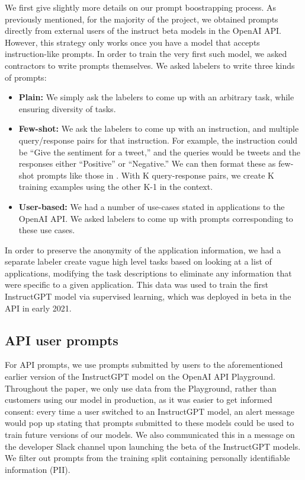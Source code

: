 \documentclass{article}
\begin{document}
We first give slightly more details on our prompt boostrapping process. 
As previously mentioned, for the majority of the project, we obtained prompts directly from external users of the instruct beta models in the OpenAI API.  However, this strategy only works once you have a model that accepts instruction-like prompts.  In order to train the very first such model, we asked contractors to write prompts themselves.  We asked labelers to write three kinds of prompts:
\begin{itemize}
    \item \textbf{Plain:}  We simply ask the labelers to come up with an arbitrary task, while ensuring diversity of tasks.
\item \textbf{Few-shot:}  We ask the labelers to come up with an instruction, and multiple query/response pairs for that instruction.  For example, the instruction could be ``Give the sentiment for a tweet,'' and the queries would be tweets and the responses either ``Positive'' or ``Negative.''  We can then format these as few-shot prompts like those in \citet{brown2020language}.  With K query-response pairs, we create K training examples using the other K-1 in the context.
\item \textbf{User-based:}  We had a number of use-cases stated in applications to the OpenAI API.  We asked labelers to come up with prompts corresponding to these use cases.
\end{itemize}
 In order to preserve the anonymity of the application information, we had a separate labeler create vague high level tasks based on looking at a list of applications, modifying the task descriptions to eliminate any information that were specific to a given application. This data was used to train the first InstructGPT model via supervised learning, which was deployed in beta in the API in early 2021. 

\subsection{API user prompts}

For API prompts, we use prompts submitted by users to the aforementioned earlier version of the InstructGPT model on the OpenAI API Playground. Throughout the paper, we only use data from the Playground, rather than customers using our model in production, as it was easier to get informed consent: every time a user switched to an InstructGPT model, an alert message would pop up stating that prompts submitted to these models could be used to train future versions of our models. We also communicated this in a message on the developer Slack channel upon launching the beta of the InstructGPT models. We filter out prompts from the training split containing personally identifiable information (PII).
\end{document}

